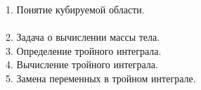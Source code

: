 
1. Понятие кубируемой области. \\
 \\

2. Задача о вычислении массы тела. \\
 

3. Определение тройного интеграла. \\


4. Вычисление тройного интеграла. \\


5. Замена переменных в тройном интеграле. \\

